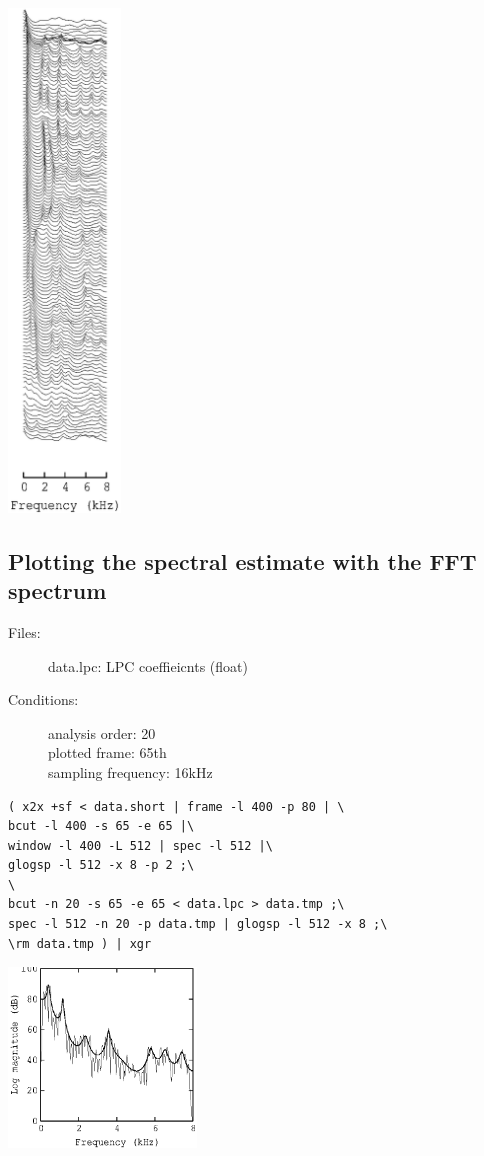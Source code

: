 \documentclass[a4paper]{article}
\begin{document}
\includegraphics[width=3cm]{data.lpc.grlogsp.eps}

\subsection{Plotting the spectral estimate with the FFT spectrum}

\begin{description}
\item[Files:]
  data.lpc: LPC coeffieicnts (float)
\item[Conditions:]
  analysis order: 20\\
  plotted frame: 65th\\
  sampling frequency: 16kHz
\end{description}

\begin{verbatim}
( x2x +sf < data.short | frame -l 400 -p 80 | \
bcut -l 400 -s 65 -e 65 |\
window -l 400 -L 512 | spec -l 512 |\
glogsp -l 512 -x 8 -p 2 ;\
\
bcut -n 20 -s 65 -e 65 < data.lpc > data.tmp ;\
spec -l 512 -n 20 -p data.tmp | glogsp -l 512 -x 8 ;\
\rm data.tmp ) | xgr
\end{verbatim}

\includegraphics[width=5cm]{data.lpc.glogsp.eps}
\end{document}
